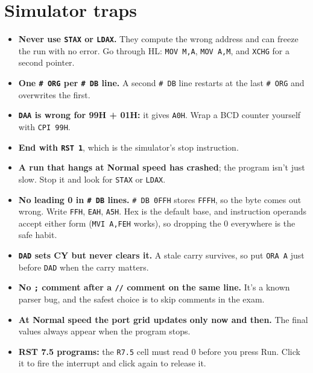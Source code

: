 \documentclass[11pt,a4paper]{article}
\newcommand{\code}[1]{\texttt{#1}}
\begin{document}
\section*{Simulator traps}
\begin{itemize}[leftmargin=*]
\item {\color{warn}\textbf{Never use \code{STAX} or \code{LDAX}.}} They compute the wrong address and can freeze the run with no error. Go through HL: \code{MOV M,A}, \code{MOV A,M}, and \code{XCHG} for a second pointer.
\item \textbf{One \code{\# ORG} per \code{\# DB} line.} A second \code{\# DB} line restarts at the last \code{\# ORG} and overwrites the first.
\item \textbf{\code{DAA} is wrong for 99H + 01H:} it gives \code{A0H}. Wrap a BCD counter yourself with \code{CPI 99H}.
\item \textbf{End with \code{RST 1}}, which is the simulator's stop instruction.
\item \textbf{A run that hangs at Normal speed has crashed}; the program isn't just slow. Stop it and look for \code{STAX} or \code{LDAX}.
\item {\color{warn}\textbf{No leading 0 in \code{\# DB} lines.}} \code{\# DB 0FFH} stores \code{FFFH}, so the byte comes out wrong. Write \code{FFH}, \code{EAH}, \code{A5H}. Hex is the default base, and instruction operands accept either form (\code{MVI A,FEH} works), so dropping the 0 everywhere is the safe habit.
\item \textbf{\code{DAD} sets CY but never clears it.} A stale carry survives, so put \code{ORA A} just before \code{DAD} when the carry matters.
\item \textbf{No \code{;} comment after a \code{//} comment on the same line.} It's a known parser bug, and the safest choice is to skip comments in the exam.
\item \textbf{At Normal speed the port grid updates only now and then.} The final values always appear when the program stops.
\item \textbf{RST 7.5 programs:} the \code{R7.5} cell must read 0 before you press Run. Click it to fire the interrupt and click again to release it.
\end{itemize}
\end{document}
